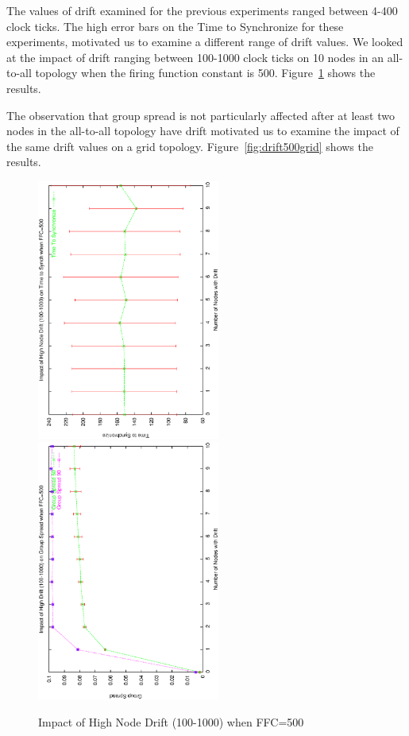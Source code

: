 The values of drift examined for the previous experiments ranged between 4-400 clock ticks.
The high error bars on the Time to Synchronize for these experiments, motivated us
to examine a different range of drift values. We looked at the impact of drift ranging between 
100-1000 clock ticks on 10 nodes in an all-to-all topology when the firing function constant 
is 500. Figure~\ref{fig:highdrift500} shows the results.

The observation that group spread is not particularly affected after at least two nodes in the
all-to-all topology have drift motivated us to examine the impact of the same drift values
on a grid topology. Figure~\ref{fig:drift500grid} shows the results.

\begin{figure}
\centerline{%
\includegraphics[width=6cm,angle=270]{figures/TTSvsHighDriftFFC500.ps}
\includegraphics[width=6cm,angle=270]{figures/GSvsHighDriftFFC500.ps}
}
\caption{Impact of High Node Drift (100-1000) when FFC=500}
\label{fig:highdrift500}
\end{figure}


